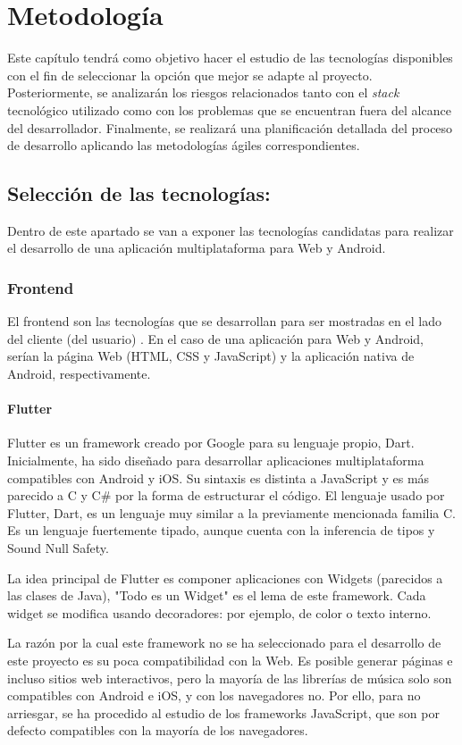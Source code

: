 
\chapter{Metodología}
\label{metodologia}
Este capítulo tendrá como objetivo hacer el estudio de las tecnologías disponibles con el fin de seleccionar la opción que mejor se adapte al proyecto. Posteriormente, se analizarán los riesgos relacionados tanto con el \textit{stack} tecnológico utilizado como con los problemas que se encuentran fuera del alcance del desarrollador. Finalmente, se realizará una planificación detallada del proceso de desarrollo aplicando las metodologías ágiles correspondientes.
\section{Selección de las tecnologías:}
Dentro de este apartado se van a exponer las tecnologías candidatas para realizar el desarrollo de una aplicación multiplataforma para Web y Android. 
\subsection{Frontend}
El frontend son las tecnologías que se desarrollan para ser mostradas en el lado del cliente (del usuario) \citep{frontend}. En el caso de una aplicación para Web y Android, serían la página Web (HTML, CSS y JavaScript) y la aplicación nativa de Android, respectivamente.
\subsubsection{Flutter}
Flutter es un framework creado por Google para su lenguaje propio, Dart. Inicialmente, ha sido diseñado para desarrollar aplicaciones multiplataforma compatibles con Android y iOS. Su sintaxis es distinta a JavaScript y es más parecido a C y C\# por la forma de estructurar el código. El lenguaje usado por Flutter, Dart, es un lenguaje muy similar a la previamente mencionada familia C. Es un lenguaje fuertemente tipado, aunque cuenta con la inferencia de tipos y Sound Null Safety.
\par La idea principal de Flutter es componer aplicaciones con Widgets (parecidos a las clases de Java), "Todo es un Widget" es el lema de este framework. Cada widget se modifica usando decoradores: por ejemplo, de color o texto interno. \citep{flutter}
\par La razón por la cual este framework no se ha seleccionado para el desarrollo de este proyecto es su poca compatibilidad con la Web. Es posible generar páginas e incluso sitios web interactivos, pero la mayoría de las librerías de música solo son compatibles con Android e iOS, y con los navegadores no. Por ello, para no arriesgar, se ha procedido al estudio de los frameworks JavaScript, que son por defecto compatibles con la mayoría de los navegadores.
